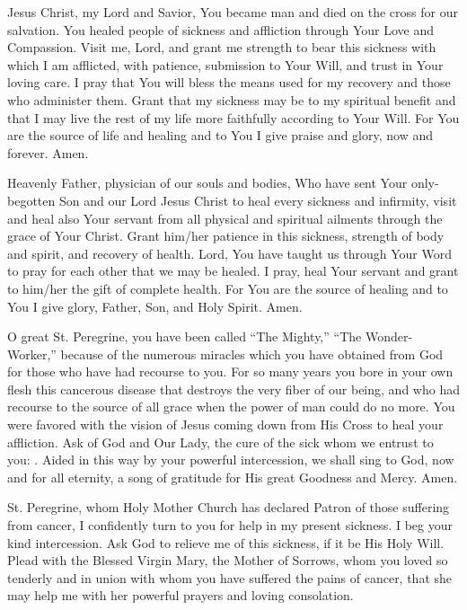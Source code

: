 Jesus Christ, my Lord and Savior, You became man and died on the cross for our salvation.
You healed people of sickness and affliction through Your Love and Compassion.
Visit me, Lord, and grant me strength to bear this sickness with which I am afflicted, with patience, submission to Your Will, and trust in Your loving care.
I pray that You will bless the means used for my recovery and those who administer them.
Grant that my sickness may be to my spiritual benefit and that I may live the rest of my life more faithfully according to Your Will.
For You are the source of life and healing and to You I give praise and glory, now and forever.
Amen.

Heavenly Father, physician of our souls and bodies, Who have sent Your only-begotten Son and our Lord Jesus Christ to heal every sickness and infirmity, visit and heal also Your servant \insertname from all physical and spiritual ailments through the grace of Your Christ.
Grant him/her patience in this sickness, strength of body and spirit, and recovery of health.
Lord, You have taught us through Your Word to pray for each other that we may be healed.
I pray, heal Your servant \insertname and grant to him/her the gift of complete health.
For You are the source of healing and to You I give glory, Father, Son, and Holy Spirit.
Amen.

O great St. Peregrine, you have been called ``The Mighty,'' ``The Wonder-Worker,'' because of the numerous miracles which you have obtained from God for those who have had recourse to you.
For so many years you bore in your own flesh this cancerous disease that destroys the very fiber of our being, and who had recourse to the source of all grace when the power of man could do no more.
You were favored with the vision of Jesus coming down from His Cross to heal your affliction.
Ask of God and Our Lady, the cure of the sick whom we entrust to you: \insertname.
Aided in this way by your powerful intercession, we shall sing to God, now and for all eternity, a song of gratitude for His great Goodness and Mercy.
Amen.

St. Peregrine, whom Holy Mother Church has declared Patron of those suffering from cancer, I confidently turn to you for help in my present sickness.
I beg your kind intercession.
Ask God to relieve me of this sickness, if it be His Holy Will.
Plead with the Blessed Virgin Mary, the Mother of Sorrows, whom you loved so tenderly and in union with whom you have suffered the pains of cancer, that she may help me with her powerful prayers and loving consolation.

